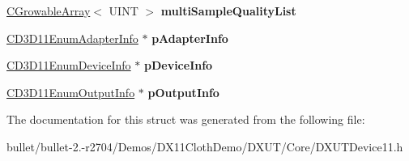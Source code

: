 \begin{DoxyCompactItemize}
\item 
\hypertarget{struct_c_d3_d11_enum_device_settings_combo_a77a574c08ba489d7cc4b7f92e6f83ff6}{\hyperlink{class_c_growable_array}{C\+Growable\+Array}$<$ U\+I\+N\+T $>$ {\bfseries multi\+Sample\+Quality\+List}}\label{struct_c_d3_d11_enum_device_settings_combo_a77a574c08ba489d7cc4b7f92e6f83ff6}

\item 
\hypertarget{struct_c_d3_d11_enum_device_settings_combo_af4935af57feb7975f1ddf8830c08c75d}{\hyperlink{class_c_d3_d11_enum_adapter_info}{C\+D3\+D11\+Enum\+Adapter\+Info} $\ast$ {\bfseries p\+Adapter\+Info}}\label{struct_c_d3_d11_enum_device_settings_combo_af4935af57feb7975f1ddf8830c08c75d}

\item 
\hypertarget{struct_c_d3_d11_enum_device_settings_combo_ad9197a66bac9125fc00e4a7db49e2649}{\hyperlink{class_c_d3_d11_enum_device_info}{C\+D3\+D11\+Enum\+Device\+Info} $\ast$ {\bfseries p\+Device\+Info}}\label{struct_c_d3_d11_enum_device_settings_combo_ad9197a66bac9125fc00e4a7db49e2649}

\item 
\hypertarget{struct_c_d3_d11_enum_device_settings_combo_a65734b6fa66a85d56cb63cb4d69975ff}{\hyperlink{class_c_d3_d11_enum_output_info}{C\+D3\+D11\+Enum\+Output\+Info} $\ast$ {\bfseries p\+Output\+Info}}\label{struct_c_d3_d11_enum_device_settings_combo_a65734b6fa66a85d56cb63cb4d69975ff}

\end{DoxyCompactItemize}


The documentation for this struct was generated from the following file\+:\begin{DoxyCompactItemize}
\item 
bullet/bullet-\/2.-\/r2704/\+Demos/\+D\+X11\+Cloth\+Demo/\+D\+X\+U\+T/\+Core/D\+X\+U\+T\+Device11.\+h\end{DoxyCompactItemize}
